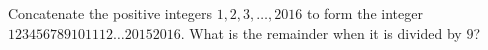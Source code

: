 Concatenate the positive integers $1,2,3,\dots,2016$ to form the integer $123456789101112\ldots20152016$. What is the remainder when it is divided by $9$?
